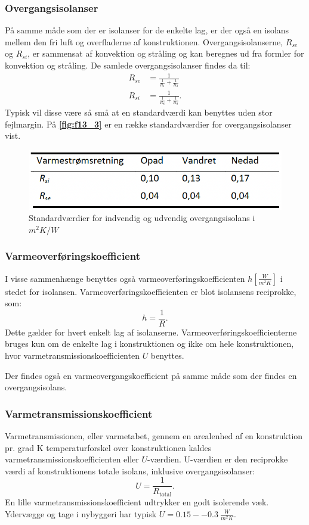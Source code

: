 \subsubsection{Overgangsisolanser}
På samme måde som der er isolanser for de enkelte lag, er der også en isolans mellem den fri luft og overfladerne af konstruktionen. Overgangsisolanserne, $R_{se}$ og $R_{si}$, er sammensat af konvektion og stråling og kan beregnes ud fra formler for konvektion og stråling. De samlede overgangsisolanser findes da til:
\begin{align*}
  R_{se} &= \frac{1}{\frac{1}{R_1} + \frac{1}{R_2}} \\
  R_{si} &= \frac{1}{\frac{1}{R_8} + \frac{1}{R_9}}
.\end{align*}
Typisk vil disse være så små at en standardværdi kan benyttes uden stor fejlmargin. På \textbf{\autoref{fig:f13_3}} er en række standardværdier for overgangsisolanser vist.

\begin{figure} [ht]
  \centering
  \includegraphics[width=0.5\linewidth]{./figures/f13_3.png}
  \caption{Standardværdier for indvendig og udvendig overgangsisolans i $\unit{m^2 K / W}$}
  \label{fig:f13_3}
\end{figure}

\subsubsection{Varmeoverføringskoefficient}
I visse sammenhænge benyttes også varmeoverføringskoefficienten $h \left[ \unit{\frac{W}{m^2 K}} \right]$ i stedet for isolansen. Varmeoverføringskoefficienten er blot isolansens reciprokke, som:
\[ 
h = \frac{1}{R}
.\]
Dette gælder for hvert enkelt lag af isolanserne. Varmeoverføringskoefficienterne bruges kun om de enkelte lag i konstruktionen og ikke om hele konstruktionen, hvor varmetransmissionskoefficienten $U$ benyttes. 

Der findes også en varmeovergangskoefficient på samme måde som der findes en overgangsisolans.


\subsubsection{Varmetransmissionskoefficient}
Varmetransmissionen, eller varmetabet, gennem en arealenhed af en konstruktion pr. grad \unit{K} temperaturforskel over konstruktionen kaldes varmetransmissionskoefficienten eller $U$-værdien. U-værdien er den reciprokke værdi af konstruktionens totale isolans, inklusive overgangsisolanser:
\[ 
U = \frac{1}{R_{\mathrm{total}}}
.\]
En lille varmetransmissionskoefficient udtrykker en godt isolerende væk. Ydervægge og tage i nybyggeri har typisk $U = \num{0,15} -- \qty{0,3}{\frac{W}{m^2 K}}$. 


